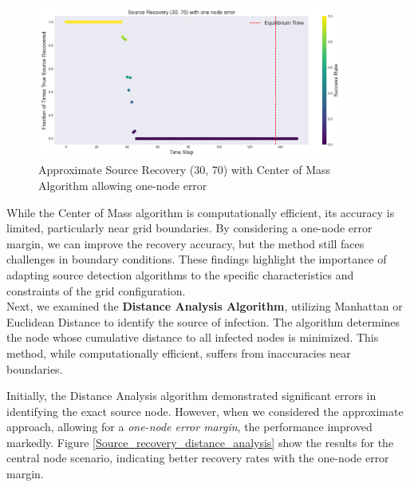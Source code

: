 \begin{figure}[H]
\centering
\includegraphics[width=0.9\textwidth]{approx_source_recovery_30_70_Center_of_Mass.png}
\caption{Approximate Source Recovery (30, 70) with Center of Mass Algorithm allowing one-node error}
\label{approx_source_recovery_30_70_Center_of_Mass}
\end{figure}

While the Center of Mass algorithm is computationally efficient, its accuracy is limited, particularly near grid boundaries. By considering a one-node error margin, we can improve the recovery accuracy, but the method still faces challenges in boundary conditions. These findings highlight the importance of adapting source detection algorithms to the specific characteristics and constraints of the grid configuration.\\

Next, we examined the \textbf{Distance Analysis Algorithm}, utilizing Manhattan or Euclidean Distance to identify the source of infection. The algorithm determines the node whose cumulative distance to all infected nodes is minimized. This method, while computationally efficient, suffers from inaccuracies near boundaries.

Initially, the Distance Analysis algorithm demonstrated significant errors in identifying the exact source node. However, when we considered the approximate approach, allowing for a \textit{one-node error margin}, the performance improved markedly. Figure \ref{Source_recovery_distance_analysis} show the results for the central node scenario, indicating better recovery rates with the one-node error margin.

